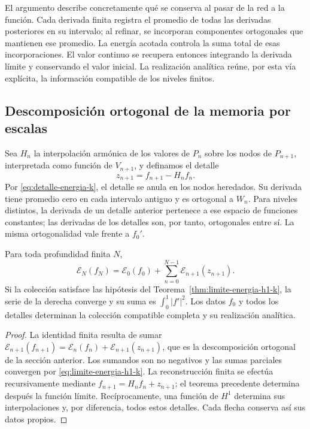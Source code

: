 El argumento describe concretamente qué se conserva al pasar de la red
a la función. Cada derivada finita registra el promedio de todas las
derivadas posteriores en su intervalo; al refinar, se incorporan
componentes ortogonales que mantienen ese promedio. La energía acotada
controla la suma total de esas incorporaciones. El valor continuo se
recupera entonces integrando la derivada límite y conservando el valor
inicial. La realización analítica reúne, por esta vía explícita, la
información compatible de los niveles finitos.

\subsection{Descomposición ortogonal de la memoria por escalas}

Sea \(H_n\) la interpolación armónica de los valores de \(P_n\)
sobre los nodos de \(P_{n+1}\), interpretada como función de
\(V_{n+1}\), y definamos el detalle
\[
 z_{n+1}=f_{n+1}-H_nf_n.
\]
Por \eqref{eq:detalle-energia-k}, el detalle se anula en los nodos
heredados. Su derivada tiene promedio cero en cada intervalo antiguo
y es ortogonal a \(W_n\). Para niveles distintos, la derivada de
un detalle anterior pertenece a ese espacio de funciones constantes;
las derivadas de los detalles son, por tanto, ortogonales entre sí.
La misma ortogonalidad vale frente a \(f_0'\).

\begin{proposition}
\label{prop:memoria-energetica-escalas-k}
Para toda profundidad finita \(N\),
\begin{equation}
 \mathcal E_N(f_N)
 =\mathcal E_0(f_0)
 +\sum_{n=0}^{N-1}\mathcal E_{n+1}(z_{n+1}).
 \label{eq:energia-telescopica-detalles-k}
\end{equation}
Si la colección satisface las hipótesis del
Teorema~\ref{thm:limite-energia-h1-k}, la serie de la derecha
converge y su suma es \(\int_0^1|f'|^2\). Los datos \(f_0\)
y todos los detalles determinan la colección compatible completa y su
realización analítica.
\end{proposition}
\begin{proof}
La identidad finita resulta de sumar
\(\mathcal E_{n+1}(f_{n+1})
=\mathcal E_n(f_n)+\mathcal E_{n+1}(z_{n+1})\), que es la
descomposición ortogonal de la sección anterior. Los sumandos son
no negativos y las sumas parciales convergen por
\eqref{eq:limite-energia-h1-k}. La reconstrucción finita se efectúa
recursivamente mediante \(f_{n+1}=H_nf_n+z_{n+1}\); el teorema
precedente determina después la función límite. Recíprocamente, una
función de \(H^1\) determina sus interpolaciones y, por diferencia,
todos estos detalles. Cada flecha conserva así sus datos propios.
\end{proof}


